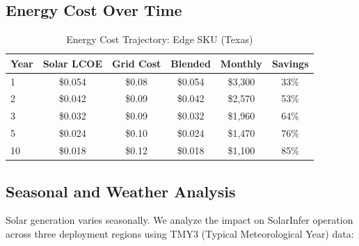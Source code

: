 \documentclass[conference,10pt,letterpaper]{IEEEtran}
\begin{document}
\subsection{Energy Cost Over Time}

\begin{table}[!t]
\caption{Energy Cost Trajectory: Edge SKU (Texas)}
\label{tab:energycost}
\centering\scriptsize
\begin{tabular}{@{}lccccc@{}}
\toprule
\textbf{Year} & \textbf{Solar LCOE} & \textbf{Grid Cost} & \textbf{Blended} & \textbf{Monthly} & \textbf{Savings} \\
\midrule
1 & \$0.054 & \$0.08 & \$0.054 & \$3,300 & 33\% \\
2 & \$0.042 & \$0.09 & \$0.042 & \$2,570 & 53\% \\
3 & \$0.032 & \$0.09 & \$0.032 & \$1,960 & 64\% \\
5 & \$0.024 & \$0.10 & \$0.024 & \$1,470 & 76\% \\
10 & \$0.018 & \$0.12 & \$0.018 & \$1,100 & 85\% \\
\bottomrule
\end{tabular}
\end{table}



\subsection{Seasonal and Weather Analysis}

Solar generation varies seasonally. We analyze the impact on SolarInfer operation across three deployment regions using TMY3 (Typical Meteorological Year) data:
\end{document}
